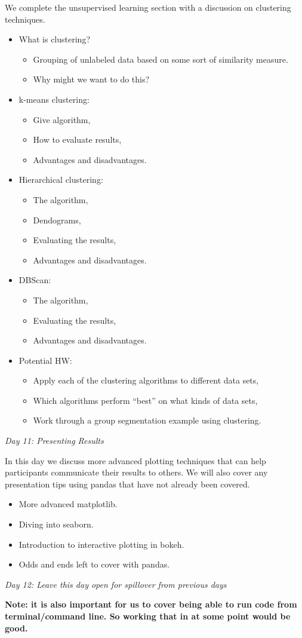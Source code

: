 \documentclass[12pt]{article}
\begin{document}
	\noindent
	We complete the unsupervised learning section with a discussion on clustering techniques.
	\begin{itemize}
		\item What is clustering?
		\begin{itemize}
			\item Grouping of unlabeled data based on some sort of similarity measure.
			\item Why might we want to do this?
		\end{itemize}
		\item k-means clustering:
		\begin{itemize}
			\item Give algorithm,
			\item How to evaluate results,
			\item Advantages and disadvantages.
		\end{itemize}
		\item Hierarchical clustering:
		\begin{itemize}
			\item The algorithm,
			\item Dendograms,
			\item Evaluating the results,
			\item Advantages and disadvantages.
		\end{itemize}
		\item DBScan:
		\begin{itemize}
			\item The algorithm,
			\item Evaluating the results,
			\item Advantages and disadvantages.
		\end{itemize}
		\item Potential HW:
		\begin{itemize}
			\item Apply each of the clustering algorithms to different data sets,
			\item Which algorithms perform ``best'' on what kinds of data sets,
			\item Work through a group segmentation example using clustering.
		\end{itemize}
	\end{itemize}
	
	
	\vspace{2mm}
	\noindent
	\textit{\large{Day 11: Presenting Results}}
	
	\noindent 
	In this day we discuss more advanced plotting techniques that can help participants communicate their results to others. We will also cover any presentation tips using pandas that have not already been covered.
	\begin{itemize}
		\item More advanced matplotlib.
		\item Diving into seaborn.
		\item Introduction to interactive plotting in bokeh.
		\item Odds and ends left to cover with pandas.
	\end{itemize}
	
	\vspace{2mm}
	\noindent
	\textit{\large{Day 12: Leave this day open for spillover from previous days}}
	
	\vspace{2mm}
	\noindent
	\textbf{Note: it is also important for us to cover being able to run code from terminal/command line. So working that in at some point would be good.}
\end{document}

